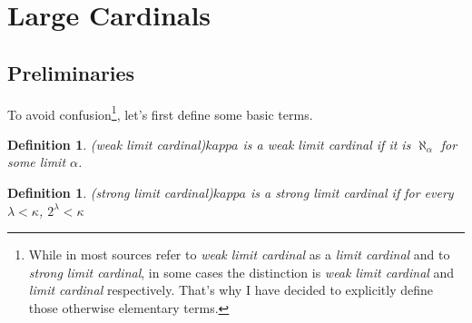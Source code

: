 \documentclass[12pt,a4paper]{article}
\newtheorem{definition}[theorem]{Definition}
\begin{document}
\newpage
\section{Large Cardinals}
\subsection{Preliminaries}
To avoid confusion\footnote{While in most sources refer to \emph{weak limit cardinal} as a \emph{limit cardinal} and to \emph{strong limit cardinal}, in some cases the distinction is \emph{weak limit cardinal} and \emph{limit cardinal} respectively. That's why I have decided to explicitly define those otherwise elementary terms.}, let's first define some basic terms.
\begin{definition}(weak limit cardinal)\label{def:weak_limit}
$kappa$ is a \emph{weak limit cardinal} if it is $\aleph_\alpha$ for some limit $\alpha$.
\end{definition}
\begin{definition}(strong limit cardinal)\label{def:strong_limit}
$kappa$ is a \emph{strong limit cardinal} if for every $\lambda < \kappa$, $2^\lambda < \kappa$
\end{definition}
\end{document}
